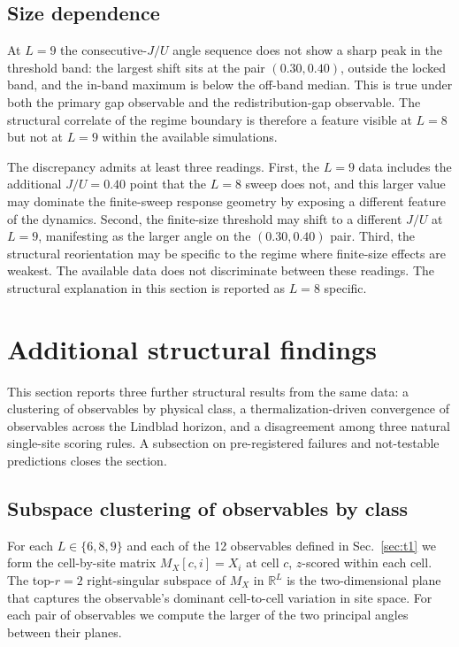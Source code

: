\documentclass[aps,prresearch,reprint,amsmath,amssymb,longbibliography,floatfix]{revtex4-2}
\begin{document}
\subsection{Size dependence}

At $L=9$ the consecutive-$J/U$ angle sequence does not show a sharp
peak in the threshold band: the largest shift sits at the pair
$(0.30, 0.40)$, outside the locked band, and the in-band maximum is
below the off-band median.
This is true under both the primary gap observable and the
redistribution-gap observable.
The structural correlate of the regime boundary is therefore a feature
visible at $L=8$ but not at $L=9$ within the available simulations.

The discrepancy admits at least three readings.
First, the $L=9$ data includes the additional $J/U=0.40$ point that the
$L=8$ sweep does not, and this larger value may dominate the
finite-sweep response geometry by exposing a different feature of the
dynamics.
Second, the finite-size threshold may shift to a different $J/U$ at
$L=9$, manifesting as the larger angle on the $(0.30, 0.40)$ pair.
Third, the structural reorientation may be specific to the regime where
finite-size effects are weakest.
The available data does not discriminate between these readings.
The structural explanation in this section is reported as $L=8$
specific.

\section{Additional structural findings}
\label{sec:t246}

This section reports three further structural results from the same
data: a clustering of observables by physical class, a
thermalization-driven convergence of observables across the Lindblad
horizon, and a disagreement among three natural single-site scoring
rules.
A subsection on pre-registered failures and not-testable predictions
closes the section.

\subsection{Subspace clustering of observables by class}
\label{sec:t2}

For each $L\in\{6,8,9\}$ and each of the 12 observables defined in
Sec.~\ref{sec:t1} we form the cell-by-site matrix $M_X[c,i] = X_i$ at
cell $c$, $z$-scored within each cell.
The top-$r=2$ right-singular subspace of $M_X$ in $\mathbb{R}^L$ is the
two-dimensional plane that captures the observable's dominant
cell-to-cell variation in site space.
For each pair of observables we compute the larger of the two principal
angles between their planes.
\end{document}
